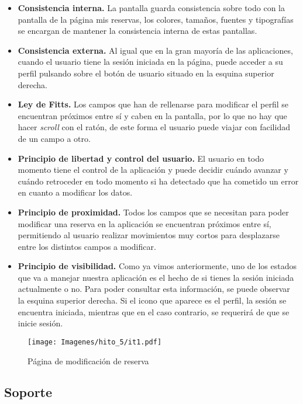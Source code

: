 \begin{itemize}
    \item \textbf{Consistencia interna.} La pantalla guarda consistencia sobre todo con la pantalla de la página
        mis reservas, los colores, tamaños, fuentes y tipografías se encargan de mantener la consistencia interna de
        estas pantallas.
    \item \textbf{Consistencia externa.} Al igual que en la gran mayoría de las aplicaciones, cuando el usuario tiene
        la sesión iniciada en la página, puede acceder a su perfil pulsando sobre el botón de usuario situado en la
        esquina superior derecha.
    \item \textbf{Ley de Fitts.} Los campos que han de rellenarse para modificar el perfil se encuentran próximos
        entre sí y caben en la pantalla, por lo que no hay que hacer \textit{scroll} con el ratón, de este forma
        el usuario puede viajar con facilidad de un campo a otro.
    \item \textbf{Principio de libertad y control del usuario.} El usuario en todo momento tiene el control de la
        aplicación y puede decidir cuándo avanzar y cuándo retroceder en todo momento si ha detectado que ha cometido
        un error en cuanto a modificar los datos.
    \item \textbf{Principio de proximidad.} Todos los campos que se necesitan para poder modificar una reserva en
        la aplicación se encuentran próximos entre sí, permitiendo al usuario realizar movimientos muy cortos para
        desplazarse entre los distintos campos a modificar.
    \item \textbf{Principio de visibilidad.} Como ya vimos anteriormente, uno de los estados que va a manejar nuestra
        aplicación es el hecho de si tienes la sesión iniciada actualmente o no. Para poder consultar esta
        información, se puede observar la esquina superior derecha. Si el icono que aparece es el perfil, la sesión
        se encuentra iniciada, mientras que en el caso contrario, se requerirá de que se inicie sesión.
\end{itemize}

\begin{figure}[H]
    \centering
    \texttt{[image: Imagenes/hito\_5/it1.pdf]}
    \caption{Página de modificación de reserva}
    \label{fig:it1_mod_reserva}
\end{figure}

\subsection*{Soporte}


